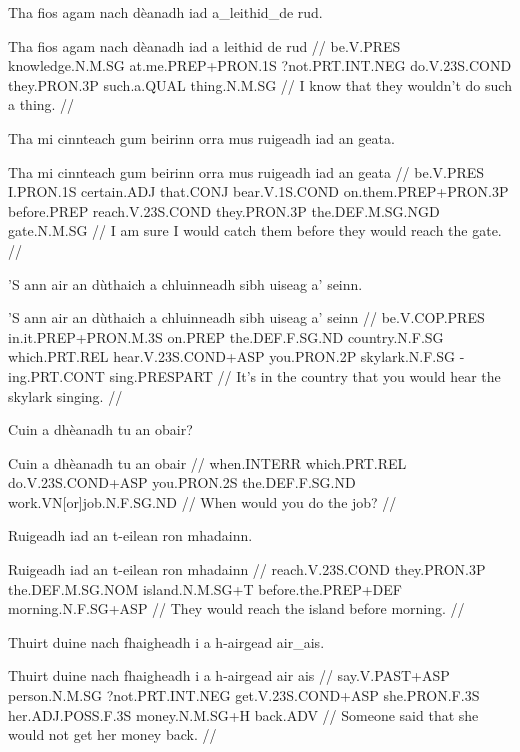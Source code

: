 \documentclass[a4paper,10pt]{article}
\begin{document}
\ex
\begingl
\glpre Tha fios agam nach dèanadh iad a\_leithid\_de rud. 

\vspace{4mm}
\gla Tha fios agam nach dèanadh iad {a leithid de} rud  //
\glb be.V.PRES knowledge.N.M.SG at.me.PREP+PRON.1S ?not.PRT.INT.NEG do.V.23S.COND they.PRON.3P such.a.QUAL thing.N.M.SG  //
\glft I know that they wouldn't do such a thing. //
\endgl
\xe

\ex
\begingl
\glpre Tha mi cinnteach gum beirinn orra mus ruigeadh iad an geata. 

\vspace{4mm}
\gla Tha mi cinnteach gum beirinn orra mus ruigeadh iad an geata  //
\glb be.V.PRES I.PRON.1S certain.ADJ that.CONJ bear.V.1S.COND on.them.PREP+PRON.3P before.PREP reach.V.23S.COND they.PRON.3P the.DEF.M.SG.NGD gate.N.M.SG  //
\glft I am sure I would catch them before they would reach the gate. //
\endgl
\xe

\ex
\begingl
\glpre 'S ann air an dùthaich a chluinneadh sibh uiseag a' seinn. 

\vspace{4mm}
\gla 'S ann air an dùthaich a chluinneadh sibh uiseag a' seinn  //
\glb be.V.COP.PRES in.it.PREP+PRON.M.3S on.PREP the.DEF.F.SG.ND country.N.F.SG which.PRT.REL hear.V.23S.COND+ASP you.PRON.2P skylark.N.F.SG -ing.PRT.CONT sing.PRESPART  //
\glft It's in the country that you would hear the skylark singing. //
\endgl
\xe

\ex
\begingl
\glpre Cuin a dhèanadh tu an obair? 

\vspace{4mm}
\gla Cuin a dhèanadh tu an obair  //
\glb when.INTERR which.PRT.REL do.V.23S.COND+ASP you.PRON.2S the.DEF.F.SG.ND work.VN[or]job.N.F.SG.ND  //
\glft When would you do the job? //
\endgl
\xe

\ex
\begingl
\glpre Ruigeadh iad an t-eilean ron mhadainn. 

\vspace{4mm}
\gla Ruigeadh iad an t-eilean ron mhadainn  //
\glb reach.V.23S.COND they.PRON.3P the.DEF.M.SG.NOM island.N.M.SG+T before.the.PREP+DEF morning.N.F.SG+ASP  //
\glft They would reach the island before morning. //
\endgl
\xe

\ex
\begingl
\glpre Thuirt duine nach fhaigheadh i a h-airgead air\_ais. 

\vspace{4mm}
\gla Thuirt duine nach fhaigheadh i a h-airgead {air ais}  //
\glb say.V.PAST+ASP person.N.M.SG ?not.PRT.INT.NEG get.V.23S.COND+ASP she.PRON.F.3S her.ADJ.POSS.F.3S money.N.M.SG+H back.ADV  //
\glft Someone said that she would not get her money back. //
\endgl
\xe
\end{document}
